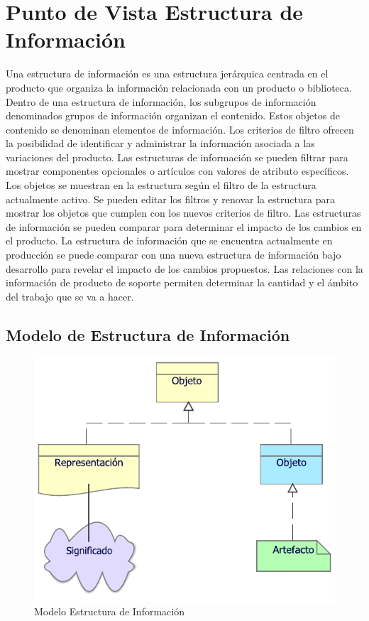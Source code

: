 \section{Punto de Vista Estructura de Información}
Una estructura de información es una estructura jerárquica centrada en el producto que organiza la información relacionada con un producto o biblioteca. Dentro de una estructura de información, los subgrupos de información denominados grupos de información organizan el contenido. Estos objetos de contenido se denominan elementos de información. Los criterios de filtro ofrecen la posibilidad de identificar y administrar la información asociada a las variaciones del producto. Las estructuras de información se pueden filtrar para mostrar componentes opcionales o artículos con valores de atributo específicos. Los objetos se muestran en la estructura según el filtro de la estructura actualmente activo. Se pueden editar los filtros y renovar la estructura para mostrar los objetos que cumplen con los nuevos criterios de filtro. Las estructuras de información se pueden comparar para determinar el impacto de los cambios en el producto. La estructura de información que se encuentra actualmente en producción se puede comparar con una nueva estructura de información bajo desarrollo para revelar el impacto de los cambios propuestos. Las relaciones con la información de producto de soporte permiten determinar la cantidad y el ámbito del trabajo que se va a hacer.

\subsection{Modelo de Estructura de Información}
\begin{figure}[h!]
	\centering
	\includegraphics[width=.62\linewidth]{imgs/modelo/EstrInformacion}
	\caption{Modelo Estructura de Información}
\end{figure}

